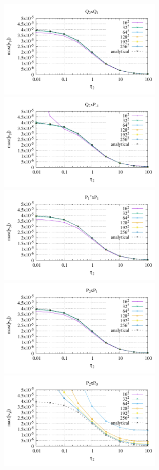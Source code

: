 \begin{center}
\includegraphics[width=8.2cm]{python_codes/fieldstone_120/paperresults/rt/structured/rt_wave_vel_Q2Q1.pdf}
\includegraphics[width=8.2cm]{python_codes/fieldstone_120/paperresults/rt/structured/rt_wave_vel_Q2Pm1.pdf}\\
\includegraphics[width=8.2cm]{python_codes/fieldstone_120/paperresults/rt/structured/rt_wave_vel_P1+P1.pdf}
\includegraphics[width=8.2cm]{python_codes/fieldstone_120/paperresults/rt/structured/rt_wave_vel_P2P1.pdf}\\
\includegraphics[width=8.2cm]{python_codes/fieldstone_120/paperresults/rt/structured/rt_wave_vel_P2P0.pdf}

\end{center}
